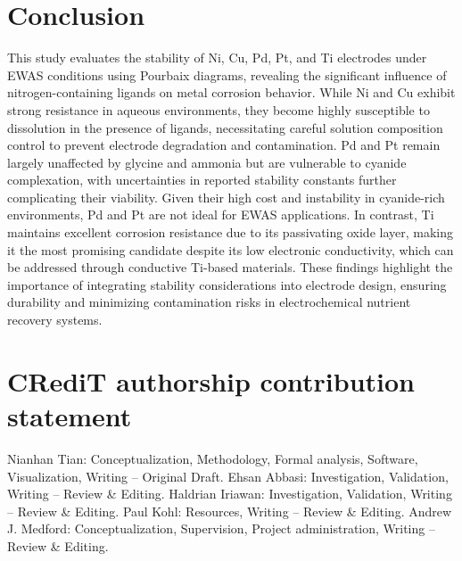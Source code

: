 \documentclass[journal=jacsat,manuscript=article]{achemso}
\begin{document}



\section{Conclusion}
This study evaluates the stability of Ni, Cu, Pd, Pt, and Ti electrodes under EWAS conditions using Pourbaix diagrams, revealing the significant influence of nitrogen-containing ligands on metal corrosion behavior. While Ni and Cu exhibit strong resistance in aqueous environments, they become highly susceptible to dissolution in the presence of  ligands, necessitating careful solution composition control to prevent electrode degradation and contamination. Pd and Pt remain largely unaffected by glycine and ammonia but are vulnerable to cyanide complexation, with uncertainties in reported stability constants further complicating their viability. Given their high cost and instability in cyanide-rich environments, Pd and Pt are not ideal for EWAS applications. In contrast, Ti maintains excellent corrosion resistance due to its passivating oxide layer, making it the most promising candidate despite its low electronic conductivity, which can be addressed through conductive Ti-based materials. These findings highlight the importance of integrating stability considerations into electrode design, ensuring durability and minimizing contamination risks in electrochemical nutrient recovery systems.


\section{CRediT authorship contribution statement}
Nianhan Tian: Conceptualization, Methodology, Formal analysis, Software, Visualization, Writing – Original Draft.  
Ehsan Abbasi: Investigation, Validation, Writing – Review \& Editing.  
Haldrian Iriawan: Investigation, Validation, Writing – Review \& Editing.  
Paul Kohl: Resources, Writing – Review \& Editing.  
Andrew J. Medford: Conceptualization, Supervision, Project administration, Writing – Review \& Editing.


\end{document}
